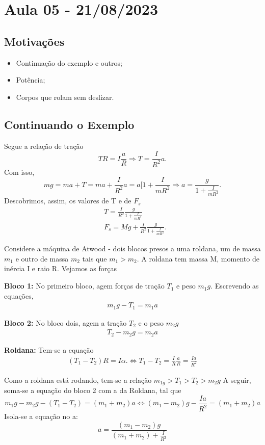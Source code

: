 \documentclass[PhysicsII/physicsII_notes.tex]{subfiles}
\begin{document}
\section{Aula 05 - 21/08/2023}
\subsection{Motivações}
\begin{itemize}
	\item Continuação do exemplo e outros;
	\item Potência;
	\item Corpos que rolam sem deslizar.
\end{itemize}
\subsection{Continuando o Exemplo}
\begin{example}[continuando...]
	Segue a relação de tração
	\[
		TR = I \frac{a}{R} \Rightarrow T = \frac{I}{R^{2}}a.
	\]
	Com isso,
	\[
		mg = ma + T = ma + \frac{I}{R^{2}}a = a[1 + \frac{I}{mR^{2}} \Rightarrow a = \frac{g}{1 + \frac{I}{mR^{2}}}.
	\]
	Descobrimos, assim, os valores de T e de \(F_{s}\)
	\begin{align*}
		 & T = \frac{I}{R^{2}}\frac{g}{1+ \frac{I}{mR^{2}}}          \\
		 & F_{s} = Mg + \frac{I}{R^{2}}\frac{g}{1+\frac{I}{mR^{2}}}.
	\end{align*}
\end{example}
\begin{example}
	Considere a máquina de Atwood - dois blocos presos a uma roldana, um de massa \(m_{1}\) e outro de massa \(m_{2}\) tais que \(m_{1} > m_{2}\).
	A roldana tem massa M, momento de inércia I e raio R. Vejamos as forças

	\textbf{Bloco 1:}
	No primeiro bloco, agem forças de tração \(T_{1}\) e peso \(m_{1}g\). Escrevendo as equações,
	\begin{align*}
		m_{1}g - T_{1} = m_{1}a
	\end{align*}

	\textbf{Bloco 2:}
	No bloco dois, agem a tração \(T_{2}\) e o peso \(m_{2}g\)
	\begin{align*}
		T_{2}-m_{2}g = m_{2}a
	\end{align*}

	\textbf{Roldana:}
	Tem-se a equação
	\begin{align*}
		(T_{1} - T_{2})R = I\alpha. \Longleftrightarrow T_{1} - T_{2} = \frac{I}{R}\frac{a}{R} = \frac{Ia}{R^{2}}
	\end{align*}

	Como a roldana está rodando, tem-se a relação \(m_{1g} > T_{1} > T_{2} > m_{2}g\)
	A seguir, soma-se a equação do bloco 2 com a da Roldana, tal que
	\[
		m_{1}g - m_{2}g - (T_{1}-T_{2}) = (m_{1}+m_{2})a \Longleftrightarrow (m_{1}-m_{2})g - \frac{Ia}{R^{2}} = (m_{1}+m_{2})a
	\]
	Isola-se a equação no a:
	\[
		a = \frac{(m_{1}-m_{2})g}{(m_{1}+m_{2})+\frac{I}{R^{2}}}
	\]
\end{example}
\end{document}
